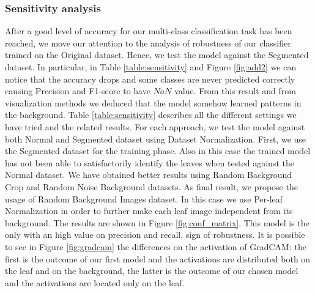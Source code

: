 \subsubsection{Sensitivity analysis}
After a good level of accuracy for our multi-class classification task has been reached, we move our attention to the analysis of robustness of our classifier trained on the Original dataset. Hence, we test the model against the Segmented dataset. In particular, in Table \ref{table:sensitivity} and Figure \ref{fig:add2} we can notice that the accuracy drops and some classes are never predicted correctly causing Precision and F1-score to have $NaN$ value. From this result and from visualization methods we deduced that the model somehow learned patterns in the background. Table \ref{table:sensitivity} describes all the different settings we have tried and the related results. For each approach, we test the model against both Normal and Segmented dataset using Dataset Normalization. First, we use the Segmented dataset for the training phase. Also in this case the trained model has not been able to satisfactorily identify the leaves when tested against the Normal dataset. We have obtained better results using Random Background Crop and Random Noise Background datasets. As final result, we propose the usage of Random Background Images dataset. In this case we use Per-leaf Normalization in order to further make each leaf image independent from its background. The results are shown in Figure \ref{fig:conf_matrix}. This model is the only with an high value on precision and recall, sign of robustness. It is possible to see in Figure \ref{fig:gradcam} the differences on the activation of GradCAM: the first is the outcome of our first model and the activations are distributed both on the leaf and on the background, the latter is the outcome of our chosen model and the activations are located only on the leaf.

